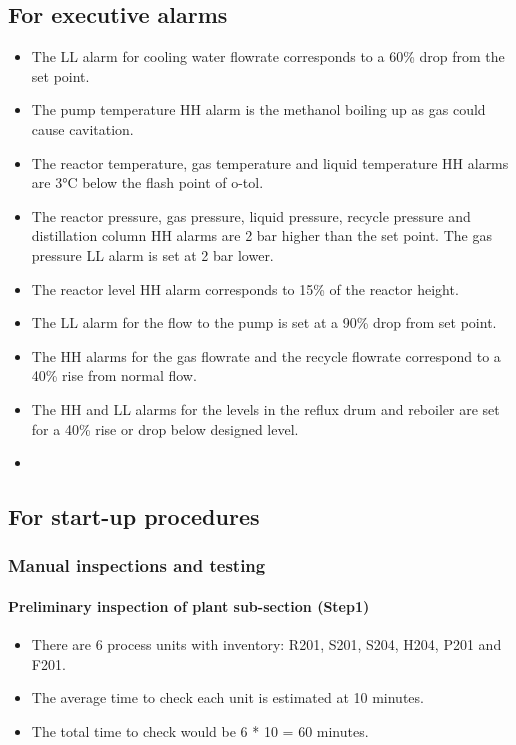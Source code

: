 \subsection{For executive alarms}
\begin{itemize}
    \item The LL alarm for cooling water flowrate corresponds to a 60\% drop from the set point.
    \item The pump temperature HH alarm is the methanol boiling up as gas could cause cavitation.
    \item The reactor temperature, gas temperature and liquid temperature HH alarms are 3°C below the flash point of o-tol.
    \item The reactor pressure, gas pressure, liquid pressure, recycle pressure and distillation column HH alarms are 2 bar higher than the set point. The gas pressure LL alarm is set at 2 bar lower.
    \item The reactor level HH alarm corresponds to 15\% of the reactor height.
    \item The LL alarm for the flow to the pump is set at a 90\% drop from set point.
    \item The HH alarms for the gas flowrate and the recycle flowrate correspond to a 40\% rise from normal flow.
    \item The HH and LL alarms for the levels in the reflux drum and reboiler are set for a 40\% rise or drop below designed level.
    \item 
\end{itemize}

\subsection{For start-up procedures}

\subsubsection{Manual inspections and testing}
\paragraph{Preliminary inspection of plant sub-section (Step1)}
    \begin{itemize}
        \item There are 6 process units with inventory: R201, S201, S204, H204, P201 and F201.
        \item The average time to check each unit is estimated at 10 minutes.
        \item The total time to check would be 6 * 10 = 60 minutes.
    \end{itemize}

